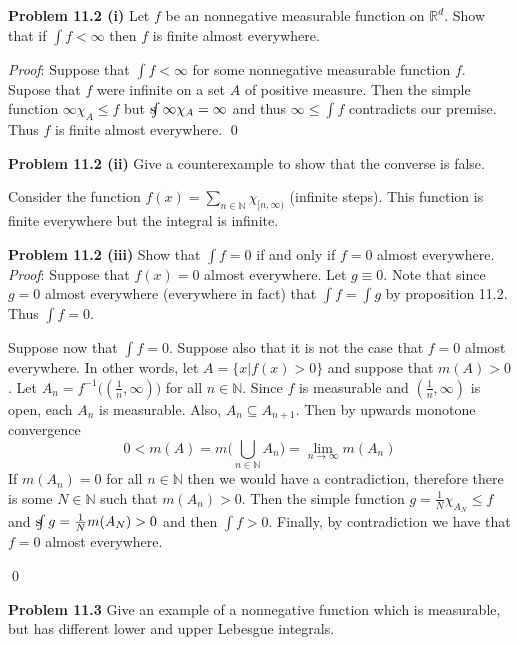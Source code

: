 \documentclass[12pt]{article}
\newcommand{\problem}[1]{\hspace{-4 ex} \large \textbf{Problem #1} }
\newcommand{\sint}{\text{s}\kern-5pt\int}
\renewenvironment{proof}{\hspace{-4 ex} \emph{Proof}:}{\qed}
\begin{document}
\problem{11.2 (i)} Let $f$ be an nonnegative measurable function on $\mathbb{R}^d$. Show that if $\int f<\infty$ then $f$ is finite almost everywhere.

	\begin{proof}
 		Suppose that $\int f<\infty$ for some nonnegative measurable function $f$. Supose that $f$ were infinite on a set $A$ of positive measure. Then the simple function $\infty \chi_A \leq f$ but $\sint \infty \chi_A = \infty$ and thus $ \infty \leq \int f$ contradicts our premise. Thus $f$ is finite almost everywhere.
 	\end{proof}
 		
\problem{11.2 (ii)} Give a counterexample to show that the converse is false. \bigbreak

 		Consider the function $f(x) = \sum\limits_{n\in \mathbb{N}} \chi_{[n, \infty)}$ (infinite steps). This function is finite everywhere but the integral is infinite. \bigbreak
 		
\problem{11.2 (iii)} Show that $\int f=0$ if and only if $f=0$ almost everywhere.
	\begin{proof}
 		Suppose that $f(x)=0$ almost everywhere. Let $g \equiv 0$. Note that since $g = 0$ almost everywhere (everywhere in fact) that $\int f = \int g$ by proposition 11.2. Thus $\int f = 0$.
 		
 		Suppose now that $\int f = 0$. Suppose also that it is not the case that $f=0$ almost everywhere. In other words, let $A = \{x \vert f(x)>0\}$ and suppose that $m(A) > 0$. Let $A_n = f^{-1} \Big( (\tfrac{1}{n},\infty) \Big)$ for all $n \in \mathbb{N}$. Since $f$ is measurable and $(\tfrac{1}{n},\infty)$ is open, each $A_n$ is measurable. Also, $A_n \subseteq A_{n+1}$. Then by upwards monotone convergence
 		$$
 		0< m(A) = m \Big( \bigcup_{n \in \mathbb{N}} A_n \Big ) = \lim_{n \to \infty} m(A_n)
 		$$
 		If $m(A_n)=0$ for all $n \in \mathbb{N}$ then we would have a contradiction, therefore there is some $N \in \mathbb{N}$ such that $m(A_n)>0$. Then the simple function $g = \tfrac{1}{N}\chi_{A_N} \leq f$ and $\sint g = \tfrac{1}{N} m(A_N) > 0$ and then $\int f >0$. Finally, by contradiction we have that $f=0$ almost everywhere.
 		
	\end{proof}

\problem{11.3} Give an example of a nonnegative function which is measurable, but has different lower and upper Lebesgue integrals.
\end{document}

